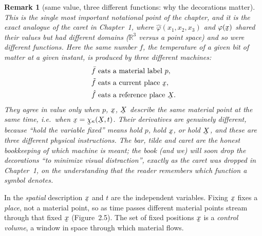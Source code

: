 \documentclass[17pt,a4paper]{extreport}
\DeclareRobustCommand{\vek}[1]{\underaccent{\tilde}{#1}}
\newcommand{\Rn}{\mathbb{R}}
\newcommand{\bx}{\vek{x}}
\newcommand{\bX}{\vek{X}}
\newcommand{\bchi}{\vek{\chi}}
\theoremstyle{scplain}
\theoremstyle{scdefn}
\newtheorem{remark}[theorem]{Remark}
\begin{document}
\begin{remark}[same value, three different functions: why the decorations
matter]\label{rem:decorations}
This is the single most important notational point of the chapter, and it is
the exact analogue of the caret in Chapter~1, where $\hat\varphi(x_1,x_2,x_3)$
and $\varphi(\bx)$ shared their values but had different domains
($\Rn^3$ versus a point space) and so were different functions. Here the
\emph{same number} $f$, the temperature of a given bit of matter at a given
instant, is produced by \emph{three different machines}:
\[
\begin{aligned}
&\bar f\ \text{eats a material label }p,\\
&\tilde f\ \text{eats a current place }\bx,\\
&\hat f\ \text{eats a reference place }\bX .
\end{aligned}
\]
They agree in value only when $p$, $\bx$, $\bX$ describe the same material
point at the same time, i.e.\ when $\bx=\bchi_\kappa(\bX,t)$. Their
\emph{derivatives} are genuinely different, because ``hold the variable
fixed'' means hold $p$, hold $\bx$, or hold $\bX$, and these are three
different physical instructions. The bar, tilde and caret are the honest
bookkeeping of which machine is meant; the book (and we) will soon drop the
decorations ``to minimize visual distraction'', exactly as the caret was
dropped in Chapter~1, on the understanding that the reader remembers which
function a symbol denotes.
\end{remark}

In the \emph{spatial} description $\bx$ and $t$ are the independent
variables. Fixing $\bx$ fixes a \emph{place}, not a material point, so as
time passes different material points stream through that fixed $\bx$
(Figure~2.5). The set of fixed positions $\bx$ is a \emph{control volume},
a window in space through which material flows.
\end{document}
